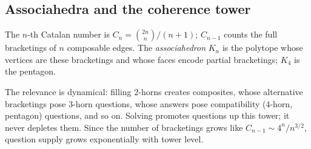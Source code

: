 \subsection{Associahedra and the coherence tower}

\begin{definition}
The $n$-th Catalan number is $C_n = \binom{2n}{n}/(n+1)$; $C_{n-1}$ counts
the full bracketings of $n$ composable edges. The \emph{associahedron} $K_n$
\citep{stasheff1963} is the polytope whose vertices are these bracketings
and whose faces encode partial bracketings; $K_4$ is the pentagon.
\end{definition}

The relevance is dynamical: filling $2$-horns creates composites, whose
alternative bracketings pose $3$-horn questions, whose answers pose
compatibility ($4$-horn, pentagon) questions, and so on. Solving promotes
questions up this tower; it never depletes them. Since the number of
bracketings grows like $C_{n-1} \sim 4^n / n^{3/2}$, question supply grows
exponentially with tower level.

